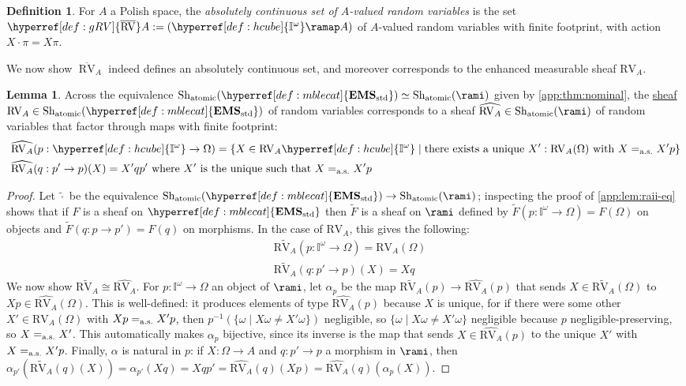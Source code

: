 \documentclass[
  sigconf,
  screen, ]{acmart}
\theoremstyle{definition}
\newtheorem{lemma}[theorem]{Lemma}
\newtheorem{definition}[theorem]{Definition}
\newcommand\nref[2]{\hyperref[#1]{#2}} \newcommand\checkhigh{{\huge{\color{red}\textbf{TODO: check}}}}
\newcommand\Shjat{\operatorname{Sh}_{{\rm atomic}}}
\newcommand\aseq{=_{\rm a.s.}}
\newcommand\texhcube{{{{\mathbb I}^\omega}}}
\newcommand\hcube{{\nref{def:hcube}{\texhcube}}}
\newcommand\texagoodname{absolutely continuous set}
\newcommand\agoodname{\texagoodname}
\newcommand\aagoodname{an \texagoodname}
\newcommand\sheafcatadj{enhanced measurable}
\newcommand\texgoodsheaf{\sheafcatadj{} sheaf}
\newcommand\goodsheaf{\texgoodsheaf}
\newcommand\texStdMble{\mathbf{EMS}_{\rm std}}
\newcommand\StdMble{{\nref{def:mblecat}{\texStdMble}}}
\newcommand\RV{\mathrm{RV}}
\newcommand\texgRV{\overline{\operatorname{RV}}}
\newcommand\gRV{{\nref{def:gRV}{\texgRV}}}
\begin{document}
\begin{definition} \label{app:def:rv-pnom}
  For $A$ a Polish space,
  the \emph{\agoodname{} of $A$-valued random variables}
  is the set $\gRV A := (\hcube\ramap A)$
  of $A$-valued random variables with finite footprint,
  with action $X\cdot\pi = X\pi$.
\end{definition}

We now show $\gRV_A$ indeed defines
\aagoodname{}, and moreover corresponds to the
\goodsheaf{} $\nref{app:lem:rv-mble-sheaf}{\RV_A}$.

\begin{lemma} \label{app:lem:rv-rami-sheaf}
  Across the equivalence
  $\Shjat(\StdMble) \simeq \Shjat(\rami)$
  given by \cref{app:thm:nominal},
  the \nref{app:lem:rv-mble-sheaf}{sheaf}
  $\RV_A\in\Shjat(\StdMble)$
  of random variables
  corresponds to a sheaf $\widehat{\RV_A}\in\Shjat(\rami)$
  of random variables that factor through maps with finite footprint:
  \begin{align*}
    &\widehat{\RV_A}(p : \hcube\to \Omega)
    = \{ X\in \RV_A{\hcube} \mid \text{there exists a unique $X' : \RV_A(\Omega)$ with $X \aseq X'p$}\} \\
    &\widehat{\RV_A}(q : p'\to p)(X) = X'qp'
    \text{ where $X'$ is the unique such that $X \aseq X'p$}
  \end{align*}
\end{lemma}
\begin{proof}
  Let $\widetilde\cdot$ be the equivalence $\Shjat(\StdMble)\to\Shjat(\rami)$;
  inspecting the proof of \cref{app:lem:raii-eq}
  shows that if $F$ is a sheaf on $\StdMble$
  then $\widetilde F$ is a sheaf on $\rami$
  defined by $\widetilde F(p : \hcube\to \Omega) = F(\Omega)$
  on objects and $\widetilde F(q : p\to p') = F(q)$ on morphisms.
  In the case of $\RV_A$,
  this gives the following:
  \begin{align*}
    &\widetilde{\RV_A}(p : \hcube\to\Omega) = \RV_A(\Omega) \\
    &\widetilde{\RV_A}(q : p'\to p)(X) = Xq
  \end{align*}
  We now show $\widetilde{\RV_A}\cong\widehat{\RV_A}$.
  For $p : \hcube\to\Omega$ an object of $\rami$,
  let $\alpha_p$
  be the map $\widetilde{\RV_A}(p)\to\widehat{\RV_A}(p)$
  that sends $X\in\widetilde{\RV_A}(\Omega)$
  to $Xp\in\widehat{\RV_A}(\Omega)$.
  This is well-defined: it produces elements
  of type $\widehat{\RV_A}(p)$ because $X$ is unique,
  for
  if there were some other $X'\in\RV_A(\Omega)$
  with $Xp\aseq X'p$,
  then $p^{-1}(\{\omega \mid X\omega\ne X'\omega\})$
  negligible, so $\{\omega \mid X\omega\ne X'\omega\}$
  negligible because $p$ negligible-preserving,
  so $X\aseq X'$.
  This automatically makes $\alpha_p$ bijective,
  since its inverse is
  the map that sends $X\in\widehat{\RV_A}(p)$
  to the unique $X'$ with $X \aseq X' p$.
  Finally, $\alpha$ is natural in $p$:
  if $X : \Omega\to A$
  and $q : p'\to p$ a morphism in $\rami$,
  then
  $\alpha_{p'}(\widetilde{\RV_A}(q)(X))
  =\alpha_{p'}(Xq)
  =Xqp'
  = \widehat{\RV_A}(q)(Xp)
  = \widehat{\RV_A}(q)(\alpha_p(X))$.
\end{proof}
\end{document}
